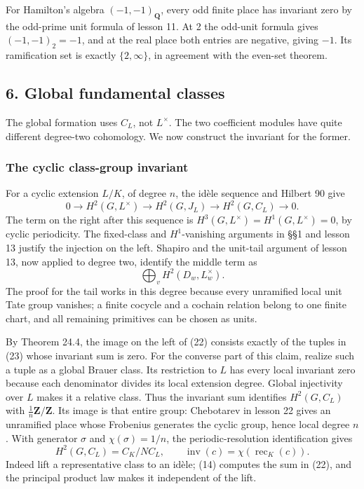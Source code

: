 \documentclass[11pt,a4paper]{article}
\begin{document}
For Hamilton's algebra \((-1,-1)_{\mathbf Q}\), every odd finite place
has invariant zero by the odd-prime unit formula of lesson 11. At 2 the
odd-unit formula gives \((-1,-1)_2=-1\), and at the real place both
entries are negative, giving \(-1\). Its ramification set is exactly
\(\{2,\infty\}\), in agreement with the even-set theorem.

\subsection{6. Global fundamental
classes}\label{global-fundamental-classes}

The global formation uses \(C_L\), not \(L^\times\). The two coefficient
modules have quite different degree-two cohomology. We now construct the
invariant for the former.

\subsubsection{The cyclic class-group
invariant}\label{the-cyclic-class-group-invariant}

For a cyclic extension \(L/K\), of degree \(n\), the idèle sequence and
Hilbert 90 give \[
0\to H^2(G,L^\times)\to H^2(G,J_L)
\to H^2(G,C_L)\to0.
\tag{22}
\] The term on the right after this sequence is
\(H^3(G,L^\times)=H^1(G,L^\times)=0\), by cyclic periodicity. The
fixed-class and \(H^1\)-vanishing arguments in §§1 and lesson 13 justify
the injection on the left. Shapiro and the unit-tail argument of lesson
13, now applied to degree two, identify the middle term as \[
\bigoplus_v H^2(D_w,L_w^\times).
\tag{23}
\] The proof for the tail works in this degree because every unramified
local unit Tate group vanishes; a finite cocycle and a cochain relation
belong to one finite chart, and all remaining primitives can be chosen
as units.

By Theorem 24.4, the image on the left of (22) consists exactly of the
tuples in (23) whose invariant sum is zero. For the converse part of
this claim, realize such a tuple as a global Brauer class. Its
restriction to \(L\) has every local invariant zero because each
denominator divides its local extension degree. Global injectivity over
\(L\) makes it a relative class. Thus the invariant sum identifies
\(H^2(G,C_L)\) with \(\tfrac1n\mathbf Z/\mathbf Z\). Its image is that
entire group: Chebotarev in lesson 22 gives an unramified place whose
Frobenius generates the cyclic group, hence local degree \(n\). With
generator \(\sigma\) and \(\chi(\sigma)=1/n\), the periodic-resolution
identification gives \[
H^2(G,C_L)=C_K/NC_L,
\qquad \operatorname{inv}(c)=\chi(\operatorname{rec}_K(c)).
\tag{24}
\] Indeed lift a representative class to an idèle; (14) computes the sum
in (22), and the principal product law makes it independent of the lift.
\end{document}
